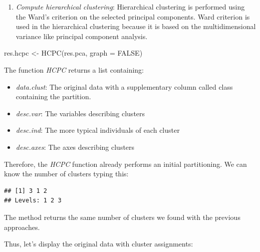 \documentclass[
]{article}
\newenvironment{Shaded}{\begin{snugshade}}{\end{snugshade}}
\newcommand{\AttributeTok}[1]{\textcolor[rgb]{0.77,0.63,0.00}{#1}}
\newcommand{\ConstantTok}[1]{\textcolor[rgb]{0.00,0.00,0.00}{#1}}
\newcommand{\FunctionTok}[1]{\textcolor[rgb]{0.00,0.00,0.00}{#1}}
\newcommand{\NormalTok}[1]{#1}
\newcommand{\OtherTok}[1]{\textcolor[rgb]{0.56,0.35,0.01}{#1}}
\newcommand{\SpecialCharTok}[1]{\textcolor[rgb]{0.00,0.00,0.00}{#1}}
\providecommand{\tightlist}{%
  \setlength{\itemsep}{0pt}\setlength{\parskip}{0pt}}
\begin{document}
\begin{enumerate}
\def\labelenumi{\arabic{enumi}.}
\setcounter{enumi}{1}
\tightlist
\item
  \emph{Compute hierarchical clustering}: Hierarchical clustering is
  performed using the Ward's criterion on the selected principal
  components. Ward criterion is used in the hierarchical clustering
  because it is based on the multidimensional variance like principal
  component analysis.
\end{enumerate}

\begin{Shaded}
\begin{Highlighting}[]
\NormalTok{res.hcpc }\OtherTok{\textless{}{-}} \FunctionTok{HCPC}\NormalTok{(res.pca, }\AttributeTok{graph =} \ConstantTok{FALSE}\NormalTok{)}
\end{Highlighting}
\end{Shaded}

The function \emph{HCPC} returns a list containing:

\begin{itemize}
\tightlist
\item
  \emph{data.clust}: The original data with a supplementary column
  called class containing the partition.
\item
  \emph{desc.var}: The variables describing clusters
\item
  \emph{desc.ind}: The more typical individuals of each cluster
\item
  \emph{desc.axes}: The axes describing clusters
\end{itemize}

Therefore, the \emph{HCPC} function already performs an initial
partitioning. We can know the number of clusters typing this:

\begin{Shaded}
\end{Shaded}

\begin{verbatim}
## [1] 3 1 2
## Levels: 1 2 3
\end{verbatim}

The method returns the same number of clusters we found with the
previous approaches.

Thus, let's display the original data with cluster assignments:
\end{document}
